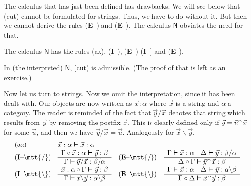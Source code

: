 The calculus that has just been defined has drawbacks. We will see 
below that (cut) cannot be formulated for strings. Thus, we have 
to do without it. But then we cannot derive the rules 
\mbox{\rm (\textbf{E}--{\mtt{\tf}})} and 
\mbox{\rm (\textbf{E}--{\mtt{\tb}})}. The calculus $\mathsf{N}$ 
obviates the need for that.
\begin{defn}
The calculus $\mathsf{N}$ has the rules \mbox{(ax)}, 
\mbox{\rm (\textbf{I}--{\mtt{\tf}})}, \mbox{\rm (\textbf{E}--{\mtt{\tf}})} 
\mbox{\rm (\textbf{I}--{\mtt{\tf}})} and 
\mbox{\rm (\textbf{E}--{\mtt{\tb}})}. 
\end{defn}
In (the interpreted) $\mathsf{N}$, (cut) is admissible. (The 
proof of that is left as an exercise.) 

Now let us turn to strings. Now we omit the interpretation, since
it has been dealt with. Our objects are now written as $\vec{x} :
\alpha$ where $\vec{x}$ is a string and $\alpha$ a category. The
reader is reminded of the fact that $\vec{y}/\vec{x}$ denotes that
string which results from $\vec{y}$ by removing the postfix
$\vec{x}$. This is clearly defined only if $\vec{y} =
\vec{u}{^{\smallfrown}}\vec{x}$ for some $\vec{u}$, and then we have
$\vec{y}/\vec{x} = \vec{u}$. Analogously for $\vec{x}\backslash
\vec{y}$.
\begin{equation}
$$\begin{array}{l@{\quad}l@{\quad}l@{\quad}l}
\mbox{(ax)} & \vec{x} : \alpha \bvdash \vec{x} : \alpha & \\
\mbox{\rm (\textbf{I}--{\mtt{\tf}})} &
        \begin{array}{c}
                \Gamma \circ \vec{x} : \alpha \bvdash \vec{y} : \beta
        \\\hline
                \Gamma \bvdash \vec{y}/ \vec{x} : \beta/\alpha
              \end{array} &
\mbox{\rm (\textbf{E}--{\mtt{\tf}})} & \begin{array}{c}
        \Gamma \bvdash \vec{x} : \alpha
   	 \quad 
    \Delta \bvdash \vec{y} : \beta/\alpha  \\\hline
            \Delta \circ \Gamma \bvdash
        \vec{y} \conc \vec{x} : \beta
              \end{array} \\
\mbox{\rm (\textbf{I}--{\mtt{\tb}})} &
        \begin{array}{c}
                \vec{x} : \alpha \circ \Gamma \bvdash \vec{y} : \beta
        \\\hline
                \Gamma \bvdash \vec{x}\backslash \vec{y} :
        \alpha \backslash \beta
                \end{array} &
\mbox{\rm (\textbf{E}--{\mtt{\tb}})} & \begin{array}{c}
        \Gamma \bvdash \vec{x} : \alpha \quad
    \Delta \bvdash \vec{y} : \alpha\backslash \beta \\\hline
            \Gamma \circ \Delta \bvdash \vec{x} \conc \vec{y} : \beta
        \end{array}
\end{array}$$
\end{equation}
